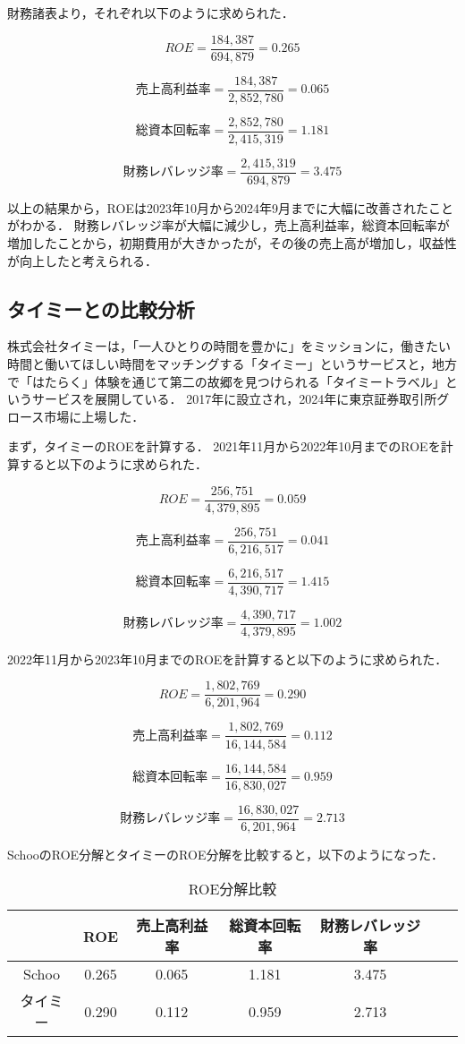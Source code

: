 \documentclass[a4paper]{ltjsarticle}
\begin{document}
財務諸表より，それぞれ以下のように求められた．

\[
ROE = \frac{184,387}{694,879} = 0.265
\]

\[
売上高利益率 = \frac{184,387}{2,852,780} = 0.065
\]

\[
総資本回転率 = \frac{2,852,780}{2,415,319} = 1.181
\]

\[
財務レバレッジ率 = \frac{2,415,319}{694,879} = 3.475
\]

以上の結果から，ROEは2023年10月から2024年9月までに大幅に改善されたことがわかる．
財務レバレッジ率が大幅に減少し，売上高利益率，総資本回転率が増加したことから，初期費用が大きかったが，その後の売上高が増加し，収益性が向上したと考えられる．

\subsection{タイミーとの比較分析}
株式会社タイミーは，「一人ひとりの時間を豊かに」をミッションに，働きたい時間と働いてほしい時間をマッチングする「タイミー」というサービスと，地方で「はたらく」体験を通じて第二の故郷を見つけられる「タイミートラベル」というサービスを展開している．
2017年に設立され，2024年に東京証券取引所グロース市場に上場した．

まず，タイミーのROEを計算する．
2021年11月から2022年10月までのROEを計算すると以下のように求められた．

\[
ROE = \frac{256,751}{4,379,895} = 0.059
\]

\[
売上高利益率 = \frac{256,751}{6,216,517} = 0.041
\]

\[
総資本回転率 = \frac{6,216,517}{4,390,717} = 1.415
\]

\[
財務レバレッジ率 = \frac{4,390,717}{4,379,895} = 1.002
\]

2022年11月から2023年10月までのROEを計算すると以下のように求められた．

\[
ROE = \frac{1,802,769}{6,201,964} = 0.290
\]

\[
売上高利益率 = \frac{1,802,769}{16,144,584} = 0.112
\]

\[
総資本回転率 = \frac{16,144,584}{16,830,027} = 0.959
\]

\[
財務レバレッジ率 = \frac{16,830,027}{6,201,964} = 2.713
\]

SchooのROE分解とタイミーのROE分解を比較すると，以下のようになった．
\begin{table}[H]
  \begin{center}
    \caption{ROE分解比較}
    \begin{tabular}{|c|c|c|c|c|c|c|} \hline
      & ROE & 売上高利益率 & 総資本回転率 & 財務レバレッジ率 \\ \hline
      Schoo & 0.265 & 0.065 & 1.181 & 3.475 \\ \hline
      タイミー & 0.290 & 0.112 & 0.959 & 2.713 \\ \hline
    \end{tabular}
  \end{center}
\end{table}
\end{document}
